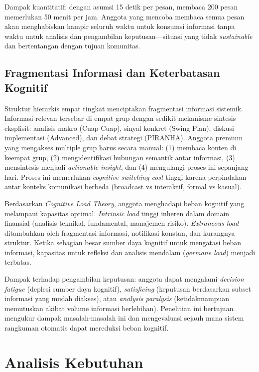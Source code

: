 Dampak kuantitatif: dengan asumsi 15 detik per pesan, membaca 200 pesan memerlukan 50 menit per jam. Anggota yang mencoba membaca semua pesan akan menghabiskan hampir seluruh waktu untuk konsumsi informasi tanpa waktu untuk analisis dan pengambilan keputusan—situasi yang tidak \textit{sustainable} dan bertentangan dengan tujuan komunitas.

\subsection{Fragmentasi Informasi dan Keterbatasan Kognitif}

Struktur hierarkis empat tingkat menciptakan fragmentasi informasi sistemik. Informasi relevan tersebar di empat grup dengan sedikit mekanisme sintesis eksplisit: analisis makro (Cuap Cuap), sinyal konkret (Swing Plan), diskusi implementasi (Advanced), dan debat strategi (PIRANHA). Anggota premium yang mengakses multiple grup harus secara manual: (1) membaca konten di keempat grup, (2) mengidentifikasi hubungan semantik antar informasi, (3) mensintesis menjadi \textit{actionable insight}, dan (4) mengulangi proses ini sepanjang hari. Proses ini memerlukan \textit{cognitive switching cost} tinggi karena perpindahan antar konteks komunikasi berbeda (broadcast vs interaktif, formal vs kasual).

Berdasarkan \textit{Cognitive Load Theory}, anggota menghadapi beban kognitif yang melampaui kapasitas optimal. \textit{Intrinsic load} tinggi inheren dalam domain finansial (analisis teknikal, fundamental, manajemen risiko). \textit{Extraneous load} ditambahkan oleh fragmentasi informasi, notifikasi konstan, dan kurangnya struktur. Ketika sebagian besar sumber daya kognitif untuk mengatasi beban informasi, kapasitas untuk refleksi dan analisis mendalam (\textit{germane load}) menjadi terbatas.

Dampak terhadap pengambilan keputusan: anggota dapat mengalami \textit{decision fatigue} (deplesi sumber daya kognitif), \textit{satisficing} (keputusan berdasarkan subset informasi yang mudah diakses), atau \textit{analysis paralysis} (ketidakmampuan memutuskan akibat volume informasi berlebihan). Penelitian ini bertujuan mengukur dampak masalah-masalah ini dan mengevaluasi sejauh mana sistem rangkuman otomatis dapat mereduksi beban kognitif.

\section{Analisis Kebutuhan}
\label{sec:analisis-kebutuhan}

